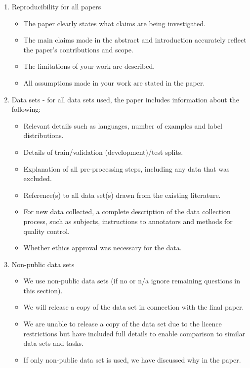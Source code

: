 \documentclass{INTERSPEECH2023}
\begin{document}
\begin{enumerate}

\item Reproducibility for all papers
\begin{itemize}

\item The paper clearly states what claims are being investigated.
\item The main claims made in the abstract and introduction accurately reflect the paper’s contributions and scope.
\item The limitations of your work are described.
\item All assumptions made in your work are stated in the paper.
 \end{itemize}

\item Data sets - for all data sets used, the paper includes information about the following:
\begin{itemize}
\item Relevant details such as languages, number of examples and label distributions.
\item Details of train/validation (development)/test splits.
\item Explanation of all pre-processing steps, including any data that was excluded.
\item Reference(s) to all data set(s) drawn from the existing literature.
\item For new data collected, a complete description of the data collection process, such as subjects, instructions to annotators and methods for quality control.
\item Whether ethics approval was necessary for the data.
\end{itemize}

\item Non-public data sets
\begin{itemize}
\item We use non-public data sets (if no or n/a ignore remaining questions in this section).
\item We will release a copy of the data set in connection with the final paper.
\item We are unable to release a copy of the data set due to the licence restrictions but have included full details to enable comparison to similar data sets and tasks.
\item If only non-public data set is used, we have discussed why in the paper.
\end{itemize}


\end{enumerate}
\end{document}

